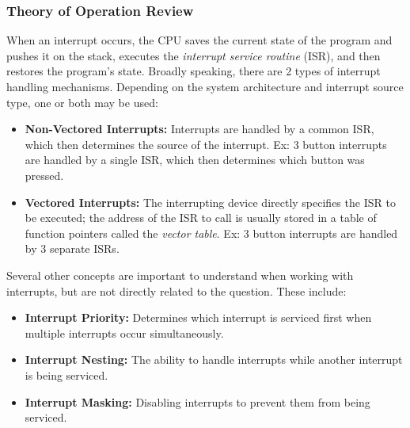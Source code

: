\documentclass[main.tex]{subfiles}
\begin{document}
\subsubsection{Theory of Operation Review}
When an interrupt occurs, the CPU saves the current state of the program and pushes it on the stack, executes the \textit{interrupt service routine} (ISR), and then restores the program's state. 
\newline
\newnoindentpara Broadly speaking, there are 2 types of interrupt handling mechanisms. Depending on the system architecture and interrupt source type, one or both may be used:
\begin{itemize}
    \item \textbf{Non-Vectored Interrupts:} Interrupts are handled by a common ISR, which then determines the source of the interrupt. Ex: 3 button interrupts are handled by a single ISR, which then determines which button was pressed.
    \item \textbf{Vectored Interrupts:} The interrupting device directly specifies the ISR to be executed; the address of the ISR to call is usually stored in a table of function pointers called the \textit{vector table}. Ex: 3 button interrupts are handled by 3 separate ISRs.
\end{itemize}

\newnoindentpara Several other concepts are important to understand when working with interrupts, but are not directly related to the question. These include:
\begin{itemize}
    \item \textbf{Interrupt Priority:} Determines which interrupt is serviced first when multiple interrupts occur simultaneously.
    \item \textbf{Interrupt Nesting:} The ability to handle interrupts while another interrupt is being serviced.
    \item \textbf{Interrupt Masking:} Disabling interrupts to prevent them from being serviced.
\end{itemize}
\end{document}
